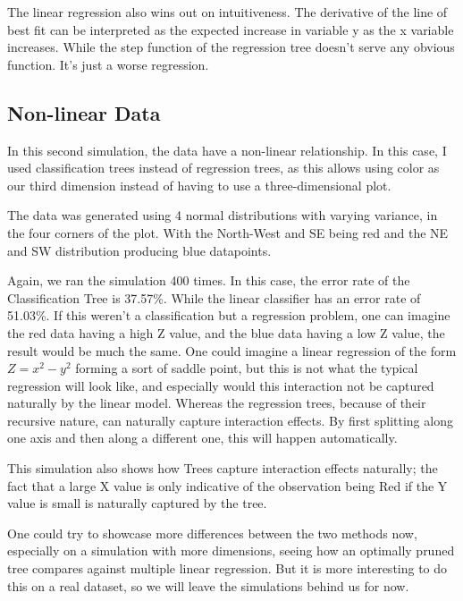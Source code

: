 \documentclass[12pt]{article}
\begin{document}
The linear regression also wins out on intuitiveness. The derivative of the line of best fit can be interpreted as the expected increase in variable y as the x variable increases. While the step function of the regression tree doesn't serve any obvious function. It's just a worse regression.


\subsection{Non-linear Data}
In this second simulation, the data have a non-linear relationship. In this case, I used classification trees instead of regression trees, as this allows using color as our third dimension instead of having to use a three-dimensional plot.

The data was generated using 4 normal distributions with varying variance, in the four corners of the plot. With the North-West and SE being red and the NE and SW distribution producing blue datapoints.



Again, we ran the simulation 400 times. In this case, the error rate of the Classification Tree is 37.57\%. While the linear classifier has an error rate of 51.03\%. If this weren't a classification but a regression problem, one can imagine the red data having a high Z value, and the blue data having a low Z value, the result would be much the same. One could imagine a linear regression of the form $Z = x^2 - y^2$ forming a sort of saddle point, but this is not what the typical regression will look like, and especially would this interaction not be captured naturally by the linear model. Whereas the regression trees, because of their recursive nature, can naturally capture interaction effects. By first splitting along one axis and then along a different one, this will happen automatically.

This simulation also shows how Trees capture interaction effects naturally; the fact that a large X value is only indicative of the observation being Red if the Y value is small is naturally captured by the tree.

One could try to showcase more differences between the two methods now, especially on a simulation with more dimensions, seeing how an optimally pruned tree compares against multiple linear regression. But it is more interesting to do this on a real dataset, so we will leave the simulations behind us for now.
\end{document}
